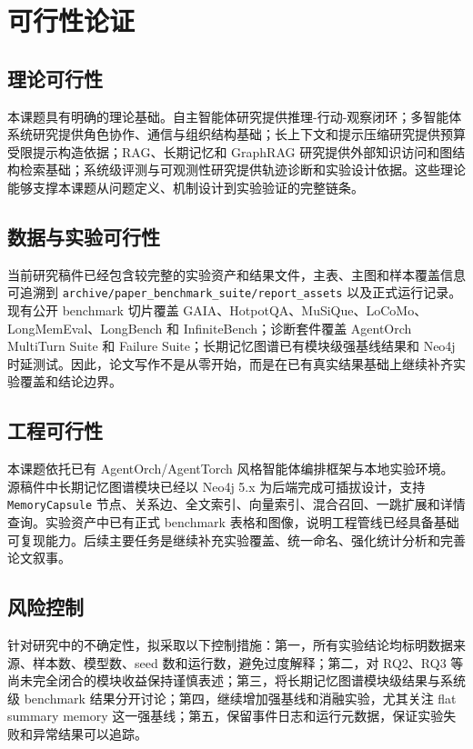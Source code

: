 \documentclass[UTF8,a4paper,zihao=-4,fontset=windows]{ctexart}
\begin{document}
\section{可行性论证}

\subsection{理论可行性}

本课题具有明确的理论基础。自主智能体研究提供推理-行动-观察闭环；多智能体系统研究提供角色协作、通信与组织结构基础；长上下文和提示压缩研究提供预算受限提示构造依据；RAG、长期记忆和 GraphRAG 研究提供外部知识访问和图结构检索基础；系统级评测与可观测性研究提供轨迹诊断和实验设计依据。这些理论能够支撑本课题从问题定义、机制设计到实验验证的完整链条。

\subsection{数据与实验可行性}

当前研究稿件已经包含较完整的实验资产和结果文件，主表、主图和样本覆盖信息可追溯到 \texttt{archive/paper\_benchmark\_suite/report\_assets} 以及正式运行记录。现有公开 benchmark 切片覆盖 GAIA、HotpotQA、MuSiQue、LoCoMo、LongMemEval、LongBench 和 InfiniteBench；诊断套件覆盖 AgentOrch MultiTurn Suite 和 Failure Suite；长期记忆图谱已有模块级强基线结果和 Neo4j 时延测试。因此，论文写作不是从零开始，而是在已有真实结果基础上继续补齐实验覆盖和结论边界。

\subsection{工程可行性}

本课题依托已有 AgentOrch/AgentTorch 风格智能体编排框架与本地实验环境。源稿件中长期记忆图谱模块已经以 Neo4j 5.x 为后端完成可插拔设计，支持 \texttt{MemoryCapsule} 节点、关系边、全文索引、向量索引、混合召回、一跳扩展和详情查询。实验资产中已有正式 benchmark 表格和图像，说明工程管线已经具备基础可复现能力。后续主要任务是继续补充实验覆盖、统一命名、强化统计分析和完善论文叙事。

\subsection{风险控制}

针对研究中的不确定性，拟采取以下控制措施：第一，所有实验结论均标明数据来源、样本数、模型数、seed 数和运行数，避免过度解释；第二，对 RQ2、RQ3 等尚未完全闭合的模块收益保持谨慎表述；第三，将长期记忆图谱模块级结果与系统级 benchmark 结果分开讨论；第四，继续增加强基线和消融实验，尤其关注 flat summary memory 这一强基线；第五，保留事件日志和运行元数据，保证实验失败和异常结果可以追踪。
\end{document}
